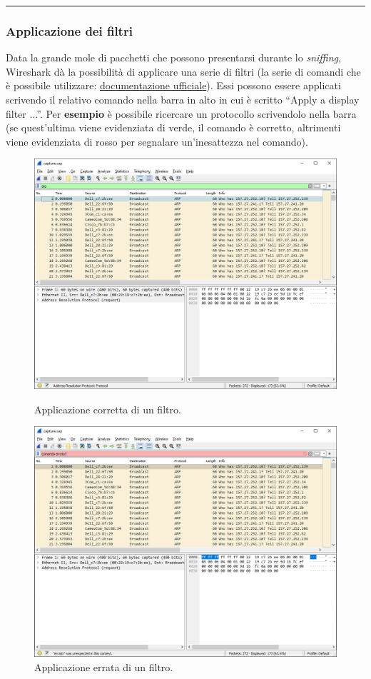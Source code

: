 \documentclass[a4paper]{article}
\newcommand{\longline}{\noindent\rule{\textwidth}{0.4pt}}
\newcommand{\dquotes}[1]{``#1''}
\begin{document}
	\longline
	
	\subsubsection{Applicazione dei filtri}
	
	Data la grande mole di pacchetti che possono presentarsi durante lo \emph{sniffing}, Wireshark dà la possibilità di applicare una serie di filtri (la serie di comandi che è possibile utilizzare: \href{https://www.wireshark.org/docs/man-pages/wireshark-filter.html}{documentazione ufficiale}). Essi possono essere applicati scrivendo il relativo comando nella barra in alto in cui è scritto \dquotes{\textsf{Apply a display filter ...}}. Per \textcolor{Green4}{\textbf{esempio}} è possibile ricercare un protocollo scrivendolo nella barra (se quest'ultima viene evidenziata di verde, il comando è corretto, altrimenti viene evidenziata di rosso per segnalare un'inesattezza nel comando).
	\begin{figure}[!htp]
		\centering
		\includegraphics[width=\textwidth]{img/wireshark/grafica-wireshark-3.png}
		\caption{Applicazione corretta di un filtro.}
		\vspace{2em}
		\includegraphics[width=\textwidth]{img/wireshark/grafica-wireshark-4.png}
		\caption{Applicazione errata di un filtro.}
	\end{figure}\newpage
\end{document}
